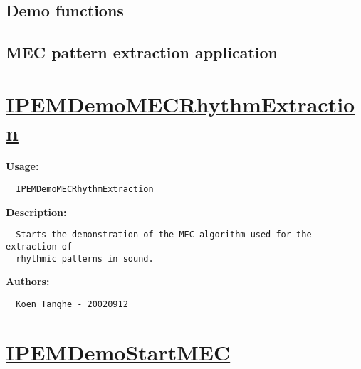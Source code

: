 \newpage
{}
~\vfill
\begin{center}
   \section*{Demo functions}
   \subsection*{MEC pattern extraction application}
\end{center}
\vfill
{}

\newpage
\section*{\hyperlink{Concepts:IPEMDemoMECRhythmExtraction}{IPEMDemoMECRhythmExtraction}}
\hypertarget{FuncRef:IPEMDemoMECRhythmExtraction}{}

\textbf{Usage:}
\begin{verbatim}  IPEMDemoMECRhythmExtraction

\end{verbatim}
\textbf{Description:}
\begin{verbatim}  Starts the demonstration of the MEC algorithm used for the extraction of
  rhythmic patterns in sound.

\end{verbatim}
\textbf{Authors:}
\begin{verbatim}  Koen Tanghe - 20020912
\end{verbatim}


\newpage
\section*{\hyperlink{Concepts:IPEMDemoStartMEC}{IPEMDemoStartMEC}}
\hypertarget{FuncRef:IPEMDemoStartMEC}{}

